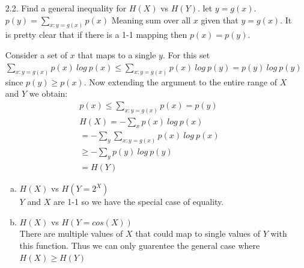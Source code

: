 \documentclass[10pt]{article}
\begin{document}
\begin{itemize}

        \item[2.2.] Find a general inequality for $H(X)$ vs $H(Y)$.
                          let $y=g(x)$. $p(y)=\sum_{x:y=g(x)}p(x)$ Meaning sum over all $x$ given that $y=g(x)$. It is pretty clear that if there is a 1-1 mapping then $p(x)=p(y)$. 
                          
                          Consider a set of $x$ that maps to a single $y$. For this set $\sum_{x:y=g(x)}p(x)\ log\ p(x) \leq \sum_{x:y=g(x)}p(x)\ log\ p(y) = p(y)\ log\ p(y)$ since $p(y)\geq p(x)$. Now extending the argument to the entire range of $X$ and $Y$ we obtain:
          \begin{eqnarray*}
          p(x)\leq \sum_{x:y=g(x)}p(x)=p(y)\\
          H(X)=-\sum_{x}p(x)\ log\ p(x)\\
          =-\sum_{y}\sum_{x:y=g(x)}p(x)\ log\ p(x)\\
          \geq -\sum_{y}p(y)\ log\ p(y)\\
          =H(Y)
          \end{eqnarray*}
          \begin{enumerate}[a)]

          \item $H(X)$ vs $H(Y=2^{X})$\\
           $Y$ and $X$ are 1-1 so we have the special case of equality.

          \item $H(X)$ vs $H(Y=cos(X))$ \\
            There are multiple values of $X$ that could map to single values of $Y$ with this function. Thus we can only guarentee the general case where $H(X) \geq H(Y)$
          \end{enumerate}


\end{itemize}
\end{document}
